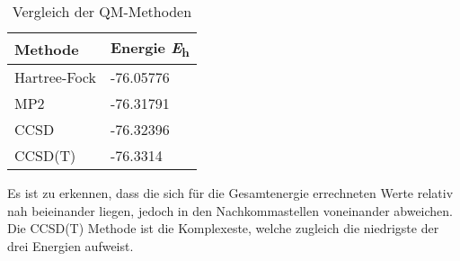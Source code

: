\documentclass[12pt]{article}
\begin{document}
\begin{onehalfspace}
\begin{table}[!htpb]
\centering
\caption{ Vergleich der QM-Methoden}
\begin{tabular}{ll}
\toprule
Methode &   Energie \si{\hartree} \\
\midrule
Hartree-Fock & -76.05776\\
MP2 & -76.31791\\
CCSD & -76.32396 \\
CCSD(T) & -76.3314\\
\bottomrule
\end{tabular}
\end{table}
\noindent
Es ist zu erkennen, dass die sich für die Gesamtenergie errechneten Werte relativ nah beieinander liegen, jedoch in den Nachkommastellen voneinander abweichen. Die CCSD(T) Methode ist die Komplexeste, welche zugleich die niedrigste der drei Energien aufweist.
\end{onehalfspace}
\end{document}
